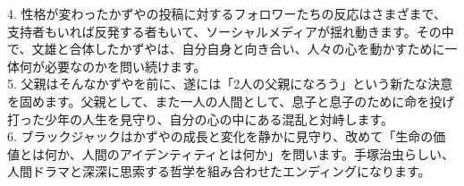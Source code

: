 \documentclass[a4j,12pt]{jsreport}
\begin{document}
\begin{breakitembox}
   4. 性格が変わったかずやの投稿に対するフォロワーたちの反応はさまざまで、支持者もいれば反発する者もいて、ソーシャルメディアが揺れ動きます。その中で、文雄と合体したかずやは、自分自身と向き合い、人々の心を動かすために一体何が必要なのかを問い続けます。\\
   5. 父親はそんなかずやを前に、遂には「2人の父親になろう」という新たな決意を固めます。父親として、また一人の人間として、息子と息子のために命を投げ打った少年の人生を見守り、自分の心の中にある混乱と対峙します。\\
   6. ブラックジャックはかずやの成長と変化を静かに見守り、改めて「生命の価値とは何か、人間のアイデンティティとは何か」を問います。手塚治虫らしい、人間ドラマと深深に思索する哲学を組み合わせたエンディングになります。
\end{breakitembox}

\vspace{20pt}
\end{document}
